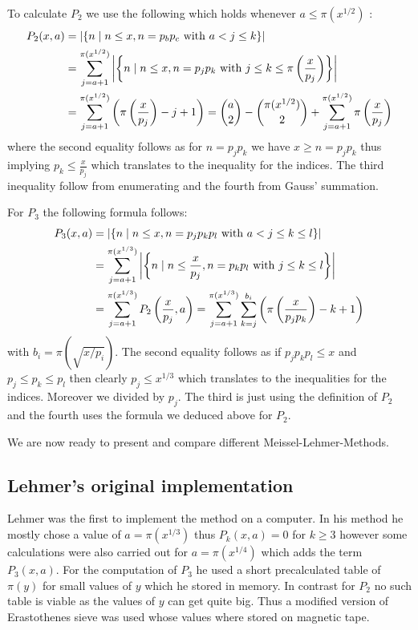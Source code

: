 To calculate $P_2$ we use the following which holds whenever $a \leq \pi(x^{1 / 2})$ :
\begin{align*}
	P_2(x,a) &= \abs{\{n \mid n \leq x, n = p_{b} p_{c} \text{ with } a < j \leq k\} }\\
			 &=  \sum_{j=a+1}^{\pi(x^{1 / 2})} \abs{\left\{ n \mid n \leq x, n = p_{j} p_{k} \text{ with } j \leq k \leq \pi\left( \frac{x}{p_{j}} \right)  \right\} } \\
			 &= \sum_{j = a+1}^{\pi(x^{1 / 2})} \left( \pi\left(\frac{x}{p_{j}}\right) -j + 1 \right)  =
			 \binom{a}{2} - \binom{\pi(x^{1/ 2})}{2} + \sum_{j=a+1}^{\pi(x^{1 / 2})} \pi\left( \frac{x}{p_{j}} \right)
\end{align*}
where the second equality follows as for $n = p_{j} p_{k}$ we have $x \geq n = p_{j} p_{k}$ thus implying $p_{k} \leq \frac{x}{p_{j}}$
which translates to the inequality for the indices.
The third inequality follow from enumerating and the fourth from Gauss' summation.

For $P_3$ the following formula follows:
\begin{align*}
	P_3(x,a) &= \abs{\{n \mid n \leq x, n = p_{j} p_{k} p_{l} \text{ with } a < j \leq k \leq l\} }\\
			 &=  \sum_{j=a+1}^{\pi(x^{1 / 3})} \abs{\left\{ n \mid n \leq \frac{x}{p_{j}}, n = p_{k} p_{l} \text{ with } j \leq k \leq l \right\} } \\
			 &= \sum_{j=a+1}^{\pi(x^{1 / 3})} P_2\left(\frac{x}{p_{j}},a\right) 
			 = \sum_{j = a+1}^{\pi(x^{1 / 3})} \sum_{k = j}^{b_{i}} \left( \pi\left(\frac{x}{p_{j}p_{k}}\right) -k + 1 \right)
\end{align*}
with $b_{i} = \pi(\sqrt{x / p_{i}})$.
The second equality follows as if $p_{j} p_{k} p_{l} \leq x$ and $p_{j} \leq p_{k} \leq p_{l}$
then clearly $p_{j} \leq x^{1 /3}$ which translates to the inequalities for the indices. Moreover we divided by $p_{j}$.
The third is just using the definition of $P_2$ and the fourth uses the formula we deduced above for $P_2$.

We are now ready to present and compare different Meissel-Lehmer-Methods.

\subsection{Lehmer's original implementation}
Lehmer was the first to implement the method on a computer.
In his method he mostly chose a value of $a = \pi(x^{1 / 3})$ thus $P_{k}(x,a) = 0$ for $k \geq 3$ 
however some calculations were also carried out for $a = \pi(x^{1 / 4})$ which adds the term $P_{3}(x,a)$.
For the computation of $P_{3}$ he used a short precalculated table of $\pi(y)$ for small values of $y$ which he stored in memory.
In contrast for $P_2$ no such table is viable as the values of $y$ can get quite big. Thus 
a modified version of Erastothenes sieve was used whose values where stored on magnetic tape.

